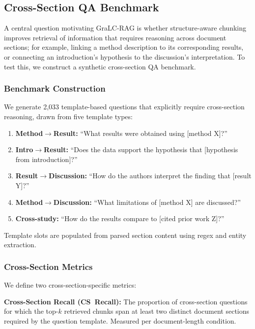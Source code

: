 \documentclass[sn-basic]{sn-jnl}
\newcommand{\gralcrag}{GraLC-RAG}
\begin{document}
\subsection{Cross-Section QA Benchmark}\label{sec:benchmark}

A central question motivating \gralcrag{} is whether structure-aware chunking improves retrieval of information that requires reasoning across document sections; for example, linking a method description to its corresponding results, or connecting an introduction's hypothesis to the discussion's interpretation. To test this, we construct a synthetic cross-section QA benchmark.

\subsubsection{Benchmark Construction}\label{sec:benchmark-construction}

We generate 2{,}033 template-based questions that explicitly require cross-section reasoning, drawn from five template types:

\begin{enumerate}
  \item \textbf{Method$\to$Result:} ``What results were obtained using [method X]?''
  \item \textbf{Intro$\to$Result:} ``Does the data support the hypothesis that [hypothesis from introduction]?''
  \item \textbf{Result$\to$Discussion:} ``How do the authors interpret the finding that [result Y]?''
  \item \textbf{Method$\to$Discussion:} ``What limitations of [method X] are discussed?''
  \item \textbf{Cross-study:} ``How do the results compare to [cited prior work Z]?''
\end{enumerate}

Template slots are populated from parsed section content using regex and entity extraction.

\subsubsection{Cross-Section Metrics}\label{sec:crosssection-metrics}

We define two cross-section-specific metrics:

\textbf{Cross-Section Recall (CS~Recall):} The proportion of cross-section questions for which the top-$k$ retrieved chunks span at least two distinct document sections required by the question template. Measured per document-length condition.
\end{document}
